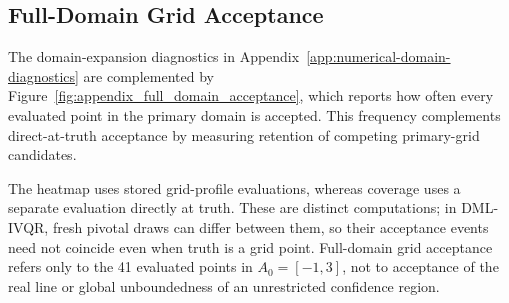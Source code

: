 
\FloatBarrier

\subsection{Full-Domain Grid Acceptance}

The domain-expansion diagnostics in Appendix~\ref{app:numerical-domain-diagnostics} are complemented by Figure~\ref{fig:appendix_full_domain_acceptance}, which reports how often every evaluated point in the primary domain is accepted. This frequency complements direct-at-truth acceptance by measuring retention of competing primary-grid candidates.

The heatmap uses stored grid-profile evaluations, whereas coverage uses a separate evaluation directly at truth. These are distinct computations; in DML-IVQR, fresh pivotal draws can differ between them, so their acceptance events need not coincide even when truth is a grid point. Full-domain grid acceptance refers only to the 41 evaluated points in $A_0=[-1,3]$, not to acceptance of the real line or global unboundedness of an unrestricted confidence region.


\FloatBarrier
